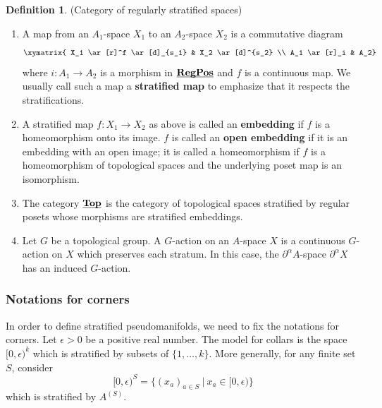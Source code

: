 \documentclass[reqno, 10pt]{amsart}
\numberwithin{equation}{section}
\numberwithin{equation}{section}
\theoremstyle{definition}
\newtheorem{defn}[thm]{Definition}
\theoremstyle{remark}
\newcommand{\beqn}{\begin{equation*}}
\newcommand{\eeqn}{\end{equation*}}
\newcommand{\regpos}{\uds{\bf RegPos}}
\newcommand{\uds}[1]{\underline{\smash{#1}}}
\begin{document}
\begin{defn}(Category of regularly stratified spaces)
\begin{enumerate}
    \item A map from an $A_1$-space $X_1$ to an $A_2$-space $X_2$ is a commutative diagram
    \beqn
    \xymatrix{ X_1 \ar[r]^f \ar[d]_{s_1} & X_2 \ar[d]^{s_2} \\
               A_1 \ar[r]_i & A_2} 
               \eeqn
    where $i: A_1 \to A_2$ is a morphism in $\regpos$ and $f$ is a continuous map. We usually call such a map a {\bf stratified map} to emphasize that it respects the stratifications.

    \item A stratified map $f: X_1 \to X_2$ as above is called an {\bf embedding} if $f$ is a homeomorphism onto its image. $f$ is called an {\bf open embedding} if it is an embedding with an open image; it is called a homeomorphism if $f$ is a homeomorphism of topological spaces and the underlying poset map is an isomorphism.

    \item The category $\uds{\bf Top}$ is the category of topological spaces stratified by regular posets whose morphisms are stratified embeddings.
    
    \item Let $G$ be a topological group. A $G$-action on an $A$-space $X$ is a continuous $G$-action on $X$ which preserves each stratum. In this case, the $\partial^\alpha A$-space $\partial^\alpha X$ has an induced $G$-action.
\end{enumerate}
\end{defn}


\subsubsection{Notations for corners}

In order to define stratified pseudomanifolds, we need to fix the notations for corners. Let $\epsilon>0$ be a positive real number. The model for collars is the space $[0, \epsilon)^k$ which is stratified by subsets of $\{1, \ldots, k\}$. More generally, for any finite set $S$, consider 
\beqn
[0, \epsilon)^S = \{(x_a)_{a\in S}\ |\ x_a \in [0, \epsilon)
\}
\eeqn
which is stratified by $A^{(S)}$. 
\end{document}
